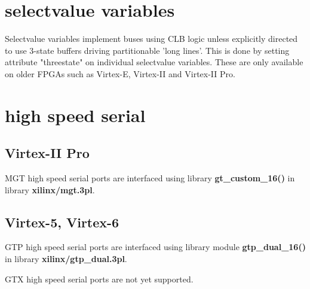     \section{selectvalue variables}

        Selectvalue variables implement buses using CLB logic unless explicitly
        directed to use 3-state buffers driving partitionable 'long lines'. This
        is done by setting attribute "threestate" on individual selectvalue
        variables. These are only available on older FPGAs such as
        Virtex-E, Virtex-II and Virtex-II Pro.
        

    \section{high speed serial}
    
    
        \subsection{Virtex-II Pro}
        
            MGT high speed serial ports are interfaced using library {\bf
            gt\_custom\_16()}  in library {\bf
            xilinx/mgt.3pl}.
    
        \subsection{Virtex-5, Virtex-6}
        
            GTP high speed serial ports are interfaced using library
            module {\bf gtp\_dual\_16()}  in
            library {\bf xilinx/gtp\_dual.3pl}.
            
            GTX high speed serial ports are not yet supported.
